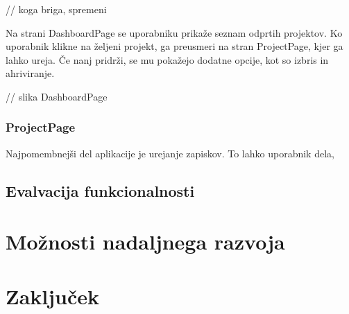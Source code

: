 \documentclass[a4paper, 12pt]{book}
\begin{document}
// koga briga, spremeni 

Na strani DashboardPage se uporabniku prikaže seznam odprtih projektov.
Ko uporabnik klikne na željeni projekt, ga preusmeri na stran ProjectPage, kjer ga lahko ureja.
Če nanj pridrži, se mu pokažejo dodatne opcije, kot so izbris in ahriviranje.

// slika DashboardPage

\subsection{ProjectPage}

Najpomembnejši del aplikacije je urejanje zapiskov.
To lahko uporabnik dela, 



\section{Evalvacija funkcionalnosti}

\chapter{Možnosti nadaljnega razvoja}
\chapter{Zaključek}

% 


\newpage %
\ \\
\clearpage
{}

\end{document}

